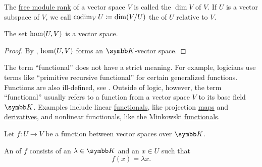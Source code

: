 \begin{Definition}\label{def:vector_space_dimension}
  The \hyperref[def:free_left_module]{free module rank} of a vector space \( V \) is called the  \( \dim V \) of \( V \). If \( U \) is a vector subspace of \( V \), we call \( \operatorname{co}\!\dim_V U \coloneqq \dim(V/U) \) the  of \( U \) relative to \( V \).
\end{Definition}

\begin{Proposition}\label{thm:linear_maps_form_algebra}
  The set \( \operatorname{hom}(U, V) \) is a vector space.
\end{Proposition}
\begin{proof}
  By , \( \operatorname{hom}(U, V) \) forms an \( \BK \)-vector space.
\end{proof}

\begin{Remark}\label{remark:functional}
  The term \enquote{functional} does not have a strict meaning. For example, logicians use terms like \enquote{primitive recursive functional} for certain generalized functions. Functions are also ill-defined, see . Outside of logic, however, the term \enquote{functional} usually refers to a function from a vector space \( V \) to its base field \( \BK \). Examples include linear \hyperref[def:linear_operator]{functionals}, like projection \hyperref[def:left_module_basis_projection]{maps} and \hyperref[def:differentiability]{derivatives}, and nonlinear functionals, like the Minkowski \hyperref[def:minkowski_functional]{functionals}.
\end{Remark}

\begin{Definition}\label{def:eigenpair}
  Let \( f: U \to V \) be a function between vector spaces over \( \BK \).

  An  of \( f \) consists of an  \( \lambda \in \BK \) and an  \( x \in U \) such that
  \begin{equation*}
    f(x) = \lambda x.
  \end{equation*}
\end{Definition}
